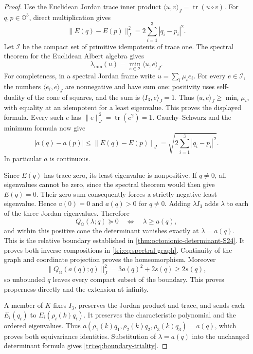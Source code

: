 \documentclass[11pt]{article}
\theoremstyle{definition}
\begin{document}
\begin{proof}
Use the Euclidean Jordan trace inner product
\(\langle u,v\rangle_J=\operatorname{tr}(u\circ v)\).
For \(q,p\in\mathbb O^3\), direct multiplication gives
\[
 \|E(q)-E(p)\|_J^2=2\sum_{i=1}^3|q_i-p_i|^2.
\]
Let \(\mathcal I\) be the compact set of primitive idempotents of
trace one. The spectral theorem for the Euclidean Albert algebra gives
\[
 \lambda_{\min}(u)=\min_{e\in\mathcal I}\langle u,e\rangle_J.
\]
For completeness, in a spectral Jordan frame write
\(u=\sum_i\mu_i e_i\). For every \(e\in\mathcal I\), the numbers
\(\langle e_i,e\rangle_J\) are nonnegative and have sum one: positivity
uses self-duality of the cone of squares, and the sum is
\(\langle I_3,e\rangle_J=1\). Thus
\(\langle u,e\rangle_J\geq\min_i\mu_i\), with equality at an
idempotent for a least eigenvalue. This proves the displayed formula.
Every such \(e\) has \(\|e\|_J^2=\operatorname{tr}(e^2)=1\).
Cauchy--Schwarz and the minimum formula now give
\begin{equation}
 |a(q)-a(p)|\leq\|E(q)-E(p)\|_J
       =\sqrt{2\sum_{i=1}^3|q_i-p_i|^2}.
 \label{tri:eq:spectral-Lipschitz}
\end{equation}
In particular \(a\) is continuous.

Since \(E(q)\) has trace zero, its least eigenvalue is nonpositive.
If \(q\ne0\), all eigenvalues cannot be zero, since the spectral theorem
would then give \(E(q)=0\). Their zero sum consequently forces a
strictly negative least eigenvalue. Hence \(a(0)=0\) and
\(a(q)>0\) for \(q\ne0\).
Adding \(\lambda I_3\) adds \(\lambda\) to each of the three Jordan
eigenvalues. Therefore
\[
 Q_{\mathbb O}(\lambda;q)\succeq0
       \quad\Longleftrightarrow\quad\lambda\geq a(q),
\]
and within this positive cone the determinant vanishes exactly at
\(\lambda=a(q)\). This is the relative boundary established in
\cref{thm:octonionic-determinant-S24}. It proves both inverse
compositions in \eqref{tri:eq:spectral-graph}.
Continuity of the graph and coordinate projection proves the
homeomorphism. Moreover
\[
 \|Q_{\mathbb O}(a(q);q)\|_J^2=3a(q)^2+2s(q)\geq2s(q),
\]
so unbounded \(q\) leaves every compact subset of the boundary.
This proves properness directly and the extension at infinity.

A member of \(K\) fixes \(I_3\), preserves the Jordan product and trace,
and sends each \(E_i(q_i)\) to \(E_i(\rho_i(k)q_i)\). It preserves
the characteristic polynomial and the ordered eigenvalues. Thus
\(a(\rho_1(k)q_1,\rho_2(k)q_2,\rho_3(k)q_3)=a(q)\), which proves
both equivariance identities. Substitution of \(\lambda=a(q)\) into
the unchanged determinant formula gives
\eqref{tri:eq:boundary-triality}.
\end{proof}
\end{document}
